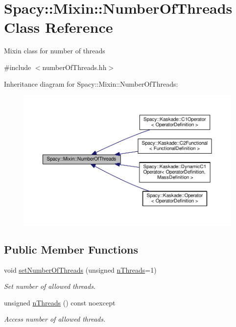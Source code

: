 \hypertarget{classSpacy_1_1Mixin_1_1NumberOfThreads}{}\section{Spacy\+:\+:Mixin\+:\+:Number\+Of\+Threads Class Reference}
\label{classSpacy_1_1Mixin_1_1NumberOfThreads}


Mixin class for number of threads  




{\ttfamily \#include $<$number\+Of\+Threads.\+hh$>$}



Inheritance diagram for Spacy\+:\+:Mixin\+:\+:Number\+Of\+Threads\+:\nopagebreak
\begin{figure}[H]
\begin{center}
\leavevmode
\includegraphics[width=350pt]{classSpacy_1_1Mixin_1_1NumberOfThreads__inherit__graph}
\end{center}
\end{figure}
\subsection*{Public Member Functions}
\begin{DoxyCompactItemize}
\item 
void \hyperlink{classSpacy_1_1Mixin_1_1NumberOfThreads_ab0c2fca77cb0d613e3bb8ce5bda11fdc_ab0c2fca77cb0d613e3bb8ce5bda11fdc}{set\+Number\+Of\+Threads} (unsigned \hyperlink{classSpacy_1_1Mixin_1_1NumberOfThreads_a385963b95b5e1ddf422393146cc71ee1_a385963b95b5e1ddf422393146cc71ee1}{n\+Threads}=1)
\begin{DoxyCompactList}\small\item\em Set number of allowed threads. \end{DoxyCompactList}\item 
unsigned \hyperlink{classSpacy_1_1Mixin_1_1NumberOfThreads_a385963b95b5e1ddf422393146cc71ee1_a385963b95b5e1ddf422393146cc71ee1}{n\+Threads} () const noexcept
\begin{DoxyCompactList}\small\item\em Access number of allowed threads. \end{DoxyCompactList}\end{DoxyCompactItemize}


